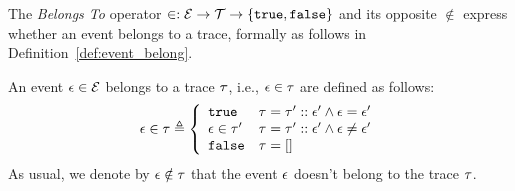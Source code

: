 The \emph{Belongs To} operator $\in : \mathcal{E} \to \mathcal{T} \to \{\mathtt{true}, \mathtt{false} \} $ and its opposite $\not\in$
express whether an event belongs to a trace, formally as follows in Definition~\ref{def:event_belong}.
\begin{defn}
  \label{def:event_belong}
    An event $\mathtt{\epsilon} \in \mathcal{E}$ belongs to a trace $\mathtt{\tau}$, i.e., $\mathtt{\epsilon} \in \mathtt{\tau}$ are defined as follows:
  \begin{equation}
    \event \in \trace  
    \triangleq \left\{
    \begin{array}{ll} 
      \etrue                  & \trace =  \trace' :: \event'
       \land \event = \event'
                                \\
      \event \in \trace' & \trace =  \trace' :: \event'
      \land \event \neq \event' \\ 
      \efalse                 & \trace = []
    \end{array}
    \right.
  \end{equation}
  As usual, we denote by $\mathtt{\epsilon} \notin \mathtt{\tau}$ that the event $\mathtt{\epsilon}$ doesn't belong to the trace $\mathtt{\tau}$.
  \end{defn}

